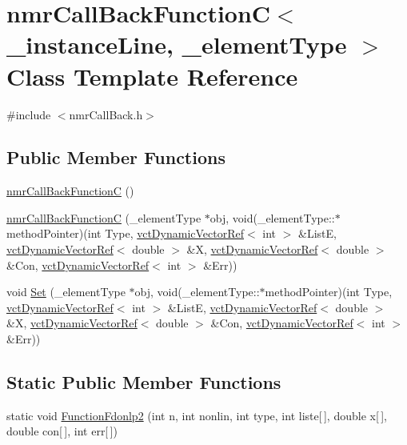 \hypertarget{classnmr_call_back_function_c}{\section{nmr\-Call\-Back\-Function\-C$<$ \-\_\-instance\-Line, \-\_\-element\-Type $>$ Class Template Reference}
\label{classnmr_call_back_function_c}
}


{\ttfamily \#include $<$nmr\-Call\-Back.\-h$>$}

\subsection*{Public Member Functions}
\begin{DoxyCompactItemize}
\item 
\hyperlink{classnmr_call_back_function_c_a9a4fefff2b562c1fdb55b3a752cd30ac}{nmr\-Call\-Back\-Function\-C} ()
\item 
\hyperlink{classnmr_call_back_function_c_a8f4d5992610a14641090b9a2d0ae8bab}{nmr\-Call\-Back\-Function\-C} (\-\_\-element\-Type $\ast$obj, void(\-\_\-element\-Type\-::$\ast$method\-Pointer)(int Type, \hyperlink{classvct_dynamic_vector_ref}{vct\-Dynamic\-Vector\-Ref}$<$ int $>$ \&List\-E, \hyperlink{classvct_dynamic_vector_ref}{vct\-Dynamic\-Vector\-Ref}$<$ double $>$ \&X, \hyperlink{classvct_dynamic_vector_ref}{vct\-Dynamic\-Vector\-Ref}$<$ double $>$ \&Con, \hyperlink{classvct_dynamic_vector_ref}{vct\-Dynamic\-Vector\-Ref}$<$ int $>$ \&Err))
\item 
void \hyperlink{classnmr_call_back_function_c_a72834b848c5c3b681d4359450756d782}{Set} (\-\_\-element\-Type $\ast$obj, void(\-\_\-element\-Type\-::$\ast$method\-Pointer)(int Type, \hyperlink{classvct_dynamic_vector_ref}{vct\-Dynamic\-Vector\-Ref}$<$ int $>$ \&List\-E, \hyperlink{classvct_dynamic_vector_ref}{vct\-Dynamic\-Vector\-Ref}$<$ double $>$ \&X, \hyperlink{classvct_dynamic_vector_ref}{vct\-Dynamic\-Vector\-Ref}$<$ double $>$ \&Con, \hyperlink{classvct_dynamic_vector_ref}{vct\-Dynamic\-Vector\-Ref}$<$ int $>$ \&Err))
\end{DoxyCompactItemize}
\subsection*{Static Public Member Functions}
\begin{DoxyCompactItemize}
\item 
static void \hyperlink{classnmr_call_back_function_c_a260b8059a5bca564bc994a92f03d9db9}{Function\-Fdonlp2} (int n, int nonlin, int type, int liste\mbox{[}$\,$\mbox{]}, double x\mbox{[}$\,$\mbox{]}, double con\mbox{[}$\,$\mbox{]}, int err\mbox{[}$\,$\mbox{]})
\end{DoxyCompactItemize}
